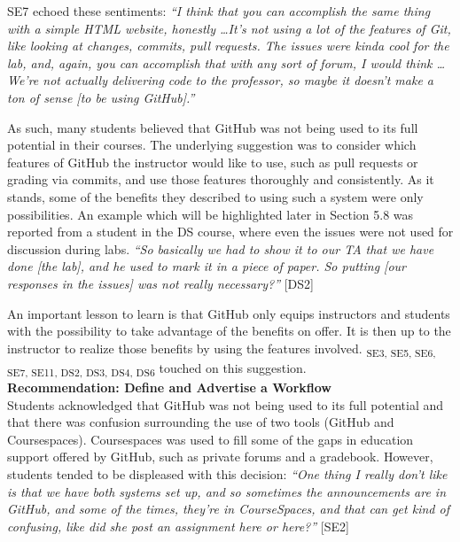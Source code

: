 SE7 echoed these sentiments: \textit{``I think that you can accomplish the same thing with a simple HTML website, honestly \ldots It's not using a lot of the features of Git, like looking at changes, commits, pull requests. The issues were kinda cool for the lab, and, again, you can accomplish that with any sort of forum, I would think \ldots We're not actually delivering code to the professor, so maybe it doesn't make a ton of sense [to be using GitHub].''}

As such, many students believed that GitHub was not being used to its full potential in their courses. The underlying suggestion was to consider which features of GitHub the instructor would like to use, such as pull requests or grading via commits, and use those features thoroughly and consistently. As it stands, some of the benefits they described to using such a system were only possibilities. An example which will be highlighted later in Section 5.8 was reported from a student in the DS course, where even the issues were not used for discussion during labs. \textit{``So basically we had to show it to our TA that we have done [the lab], and he used to mark it in a piece of paper. So putting [our responses in the issues] was not really necessary?''} [DS2]

An important lesson to learn is that GitHub only equips instructors and students with the possibility to take advantage of the benefits on offer. It is then up to the instructor to realize those benefits by using the features involved. \textsubscript{SE3, SE5, SE6, SE7, SE11, DS2, DS3, DS4, DS6} touched on this suggestion. \\

\textbf{Recommendation: Define and Advertise a Workflow} \\
Students acknowledged that GitHub was not being used to its full potential and that there was confusion surrounding the use of two tools (GitHub and Coursespaces). Coursespaces was used to fill some of the gaps in education support offered by GitHub, such as private forums and a gradebook. However, students tended to be displeased with this decision: \textit{``One thing I really don't like is that we have both systems set up, and so sometimes the announcements are in GitHub, and some of the times, they're in CourseSpaces, and that can get kind of confusing, like did she post an assignment here or here?''} [SE2]


